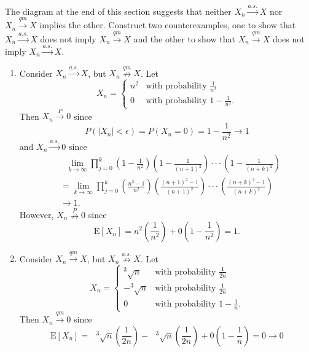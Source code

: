 \documentclass[12pt,]{article}
\begin{document}
The diagram at the end of this section suggests that neither
\(X_n \overset{a.s.} \rightarrow X\) nor
\(X_n \overset{qm} \rightarrow X\) implies the other. Construct two
counterexamples, one to show that \(X_n \overset{a.s.} \rightarrow X\)
does not imply \(X_n \overset{qm} \rightarrow X\) and the other to show
that \(X_n \overset{qm} \rightarrow X\) does not imply
\(X_n \overset{a.s.} \rightarrow X.\)

\begin{enumerate}
\def\labelenumi{(\arabic{enumi})}
\item
  Consider \(X_n \overset{a.s.}\rightarrow X\), but
  \(X_n \overset{qm}\nrightarrow X\). Let \[X_n = \begin{cases}
                                 n^2& \text{with probability $\frac{1}{n^2}$} \\
                                 0 & \text{with probability $1-\frac{1}{n^2}$}.
    \end{cases}\] Then \(X_n\overset{P}\rightarrow 0\) since
  \[P(|X_n| < \epsilon) = P(X_n = 0) = 1 - \frac{1}{n^2}\rightarrow 1\]
  and \(X_n\overset{a.s.}\rightarrow 0\) since \begin{align*}
  &\text{ }\lim_{k\rightarrow \infty}\prod_{j=0}^k \left(1-\frac{1}{n^2}\right)\left(1-\frac{1}{(n+1)^2}\right)\cdot\cdot\cdot \left(1-\frac{1}{(n+k)^2}\right)\\ &=\lim_{k\rightarrow \infty}\prod_{j=0}^k \left(\frac{n^2-1}{n^2}\right)\left(\frac{(n+1)^2-1}{(n+1)^2}\right)\cdot\cdot\cdot \left(\frac{(n+k)^2-1}{(n+k)^2}\right)\\
  &\rightarrow 1.
  \end{align*} However, \(X_n \overset{P}\nrightarrow 0\) since
  \[\text{E}[X_n]=n^2\left(\frac{1}{n^2}\right)+0\left(1-\frac{1}{n^2}\right)=1.\]
\item
  Consider \(X_n \overset{qm}\rightarrow X\), but
  \(X_n \overset{a.s.}\nrightarrow X\). Let \[X_n = \begin{cases}
                                 ^3\sqrt{n}& \text{with probability $\frac{1}{2n}$} \\
                                 -^3\sqrt{n} & \text{with probability $\frac{1}{2n}$}\\
                                 0 & \text{with probability $1-\frac{1}{n}$}.
    \end{cases}\] Then \(X_n \overset{qm}\rightarrow 0\) since
  \[\text{E}[X_n]=\text{ }^3\sqrt n\left(\frac{1}{2n}\right) - \text{ }^3\sqrt n\left(\frac{1}{2n}\right)+0\left(1-\frac{1}{n}\right)=0\rightarrow 0\]

\end{enumerate}
\end{document}
